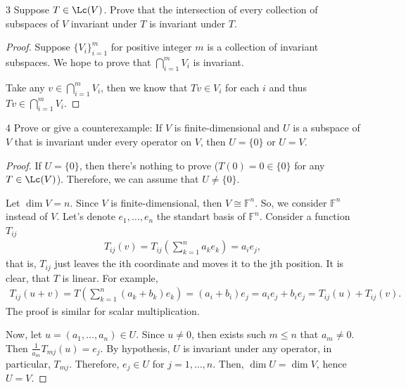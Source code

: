 \documentclass{extarticle}
\begin{document}
\begin{problem}{3}
    Suppose \(T \in \Lc(V)\). Prove that the intersection of every collection of 
    subspaces of \(V\) invariant under \(T\) is invariant under \(T\).
\end{problem}

\begin{proof}
Suppose \(\{V_i\}_{i=1}^m\) for positive integer \(m\) is a collection of invariant subspaces. 
We hope to prove that \(\bigcap_{i=1}^m V_i\) is invariant. 

Take any \(v \in \bigcap_{i=1}^m V_i\), then we know that \(Tv \in V_i\) for each \(i\)
and thus \(Tv \in \bigcap_{i=1}^m V_i\).
\end{proof}

\begin{problem}{4}
    Prove or give a counterexample: If $ V $ is finite-dimensional and 
    $ U $ is a subspace of $ V $ that is invariant under every operator on $ V $,
    then $ U = \{0\} $ or $ U = V $.
\end{problem}

\begin{proof}
    If $ U = \{ 0 \} $, then there's nothing to prove
    ($ T(0) = 0 \in \{ 0 \} $ for any $ T  \in \Lc(V) $).
    Therefore, we can assume that $ U \ne \{ 0 \} $.

    Let $ \dim V = n $. Since $ V $ is finite-dimensional, then $ V \cong \mathbb{F}^{n} $.
    So, we consider $ \mathbb{F}^{n} $ instead of $ V $. Let's denote $ e_1, \ldots, e_{n} $
    the standart basis of $ \mathbb{F}^{n} $. Consider a function $ T_{ij} $
    \begin{gather*}
        T_{ij}(v) = T_{ij}( \sum_{k=1}^{n} a_k e_k) = a_i e_j,
    \end{gather*}
    that is, $ T_{ij} $ just leaves the ith coordinate and moves it to the jth position.
    It is clear, that $ T $ is linear. For example,
    \begin{gather*}
        T_{ij}(u + v) = T( \sum_{k=1}^{n} (a_k + b_k) e_k ) =
        (a_i + b_i) e_j = a_i e_j + b_i e_j = T_{ij}(u) + T_{ij} (v).
    \end{gather*}
    The proof is similar for scalar multiplication.

    Now, let $ u = (a_1, \ldots, a_n) \in U $. Since $ u \ne 0 $, then exists such $ m \leq n $
    that $ a_m \ne 0 $. Then $ \frac{1}{a_m} T_{mj}(u) = e_j $. By hypothesis, 
    $ U  $ is invariant under any operator, in particular, $ T_{mj} $. Therefore,
    $ e_j \in U $ for $ j = 1, \ldots, n $. Then, $ \dim U = \dim V $, hence $ U = V $.
\end{proof}
\end{document}
